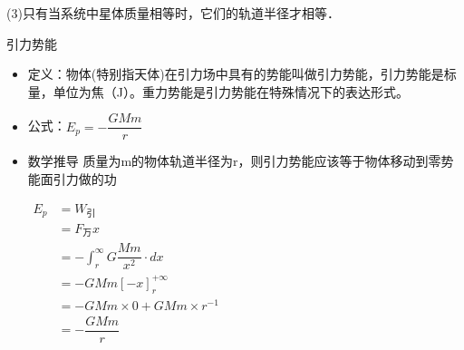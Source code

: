 (3)只有当系统中星体质量相等时，它们的轨道半径才相等．
\newpage
\begin{problemset}
	\item 引力势能
	\begin{itemize}
		\item 定义：物体(特别指天体)在引力场中具有的势能叫做引力势能，引力势能是标量，单位为焦（J）。重力势能是引力势能在特殊情况下的表达形式。
		\item 公式：$E_p=-\dfrac{GMm}{r}$
		\item 数学推导
		质量为m的物体轨道半径为r，则引力势能应该等于物体移动到零势能面引力做的功
		
		$\begin{aligned} 
		E_p &=W_{\text{引}} \\
		 &=F_{\text{万}}x\\
		  &=-\int_r^{\infty}G\dfrac{Mm}{x^2}· dx\\
		  &=-GMm[-x]_r^{+\infty}\\
		  &=-GMm\times 0+GMm\times r^{-1}\\
		  &=-\dfrac{GMm}{r}
		 \end{aligned}$
	\end{itemize}
\end{problemset}
